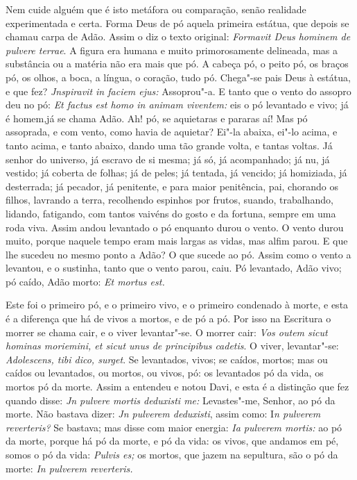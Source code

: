 Nem cuide alguém que é isto metáfora ou comparação, senão realidade
experimentada e certa. Forma Deus de pó aquela primeira estátua, que
depois se chamau carpa de Adão. Assim o diz o texto original:
\emph{Formavit Deus hominem de pulvere terrae}. A figura era %
humana e muito primorosamente delineada, mas a substância ou a matéria
não era mais que pó. A cabeça pó, o peito pó, os braços pó, os olhos, a
boca, a língua, o coração, tudo pó. Chega"-se pais Deus à estátua, e que
fez? \emph{Jnspiravit in faciem ejus:} Assoprou"-a. E tanto %
que o vento do assopro deu no pó: \emph{Et factus est homo in animam
viventem:} eis o pó levantado e vivo; já é homem,já se chama Adão. Ah!
pó, se aquietaras e pararas aí! Mas pó assoprada, e com vento, como
havia de aquietar? Ei"-la abaixa, ei"-lo acima, e tanto acima, e tanto
abaixo, dando uma tão grande volta, e tantas voltas. Já senhor do
universo, já escravo de si mesma; já só, já acompanhado; já nu, já
vestido; já coberta de folhas; já de peles; já tentada, já vencido; já
homiziada, já desterrada; já pecador, já penitente, e para maior
penitência, pai, chorando os filhos, lavrando a terra, recolhendo
espinhos por frutos, suando, trabalhando, lidando, fatigando, com tantos
vaivéns do gosto e da fortuna, sempre em uma roda viva. Assim andou
levantado o pó enquanto durou o vento. O vento durou muito, porque
naquele tempo eram mais largas as vidas, mas alfim parou. E que lhe
sucedeu no mesmo ponto a Adão? O que sucede ao pó. Assim como o vento a
levantou, e o sustinha, tanto que o vento parou, caiu. Pó levantado,
Adão vivo; pó caído, Adão morto: \emph{Et mortus est.}

Este foi o primeiro pó, e o primeiro vivo, e o primeiro condenado
à morte, e esta é a diferença que há de vivos a mortos, e de pó a pó.
Por isso na Escritura o morrer se chama cair, e o viver levantar"-se. O
morrer cair: \emph{Vos outem sicut hominas moriemini, et sicut unus de
principibus cadetis}. O viver, levantar"-se: \emph{Adolescens, tibi
dico, surget}. Se levantados, vivos; se caídos, mortos; mas ou caídos
ou levantados, ou mortos, ou vivos, pó: os levantados pó da vida, os
mortos pó da morte. Assim a entendeu e notou Davi, e esta é a distinção
que fez quando disse: \emph{Jn pulvere mortis deduxisti me:}
Levastes"-me, Senhor, ao pó da morte. Não bastava dizer: \emph{Jn
pulverem deduxisti}, assim como: I\emph{n pulverem reverteris?} Se
bastava; mas disse com maior energia: \emph{Ia pulverem mortis:} ao pó
da morte, porque há pó da morte, e pó da vida: os vivos, que andamos em
pé, somos o pó da vida: \emph{Pulvis es;} os mortos, que jazem na
sepultura, são o pó da morte: \emph{In pulverem reverteris.}

